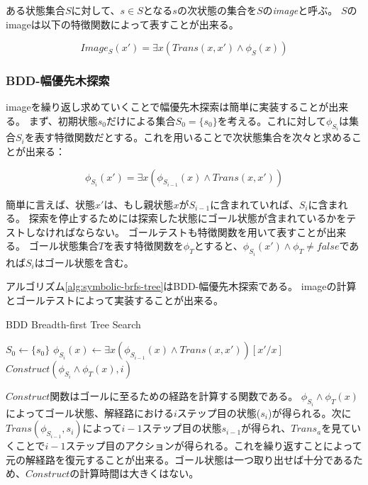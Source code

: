 ある状態集合$S$に対して、$s \in S$となる$s$の次状態の集合を$S$の{\it image}と呼ぶ。
$S$のimageは以下の特徴関数によって表すことが出来る。

\begin{equation}
	Image_S(x') = \exists x (Trans(x,x') \land \phi_S(x))
\end{equation}


\subsubsection{BDD-幅優先木探索}

imageを繰り返し求めていくことで幅優先木探索は簡単に実装することが出来る。
まず、初期状態$s_0$だけによる集合$S_0 = \{s_0\}$を考える。これに対して$\phi_{S_{i}}$は集合$S_i$を表す特徴関数だとする。これを用いることで次状態集合を次々と求めることが出来る：

\begin{equation}
	\phi_{S_i}(x') = \exists x (\phi_{S_{i-1}}(x) \land Trans(x,x'))
\end{equation}

簡単に言えば、状態$x'$は、もし親状態$x$が$S_{i-1}$に含まれていれば、$S_i$に含まれる。
探索を停止するためには探索した状態にゴール状態が含まれているかをテストしなければならない。
ゴールテストも特徴関数を用いて表すことが出来る。
ゴール状態集合$T$を表す特徴関数を$\phi_T$とすると、$\phi_{S_i}(x') \land \phi_T \neq false$であれば$S_i$はゴール状態を含む。

アルゴリズム\ref{alg:symbolic-brfs-tree}はBDD-幅優先木探索である。
imageの計算とゴールテストによって実装することが出来る。


\begin{algorithm}
\caption{BDD Breadth-first Tree Search}
\label{alg:bdd-brfs-tree}
	$S_0 \leftarrow \{s_0\}$\;
	 {
		$\phi_{S_i}(x) \leftarrow \exists x (\phi_{S_{i-1}}(x) \land Trans(x,x'))[x'/x]$\;
		 {
			\Return $Construct(\phi_{S_i} \land \phi_T(x), i)$\;
		}
	}
\end{algorithm}


$Construct$関数はゴールに至るための経路を計算する関数である。
$\phi_{S_i} \land \phi_T(x)$によってゴール状態、解経路における$i$ステップ目の状態($s_i$)が得られる。次に$Trans(\phi_{S_{i-1}}, s_i)$によって$i-1$ステップ目の状態$s_{i-1}$が得られ、$Trans_a$を見ていくことで$i-1$ステップ目のアクションが得られる。これを繰り返すことによって元の解経路を復元することが出来る。ゴール状態は一つ取り出せば十分であるため、$Construct$の計算時間は大きくはない。

